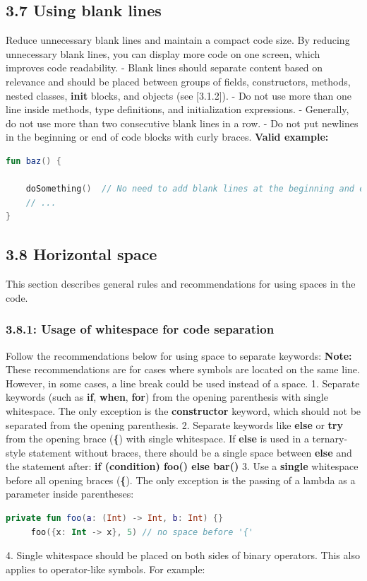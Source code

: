 \subsection*{\textbf{3.7 Using blank lines}}
\label{sec:3.7}
Reduce unnecessary blank lines and maintain a compact code size. By reducing unnecessary blank lines, you can display more code on one screen, which improves code readability.
- Blank lines should separate content based on relevance and should be placed between groups of fields, constructors, methods, nested classes, \textbf{init} blocks, and objects (see [3.1.2]).
- Do not use more than one line inside methods, type definitions, and initialization expressions.
- Generally, do not use more than two consecutive blank lines in a row.
- Do not put newlines in the beginning or end of code blocks with curly braces.
\textbf{Valid example:}
\begin{lstlisting}[language=Kotlin]
fun baz() {
        
    doSomething()  // No need to add blank lines at the beginning and end of the code block
    // ...
}
\end{lstlisting}
\subsection*{\textbf{3.8 Horizontal space}}
\label{sec:3.8}
This section describes general rules and recommendations for using spaces in the code.
\subsubsection*{\textbf{3.8.1: Usage of whitespace for code separation}}
\leavevmode\newline
\label{sec:3.8.1}
Follow the recommendations below for using space to separate keywords:
\textbf{Note:} These recommendations are for cases where symbols are located on the same line. However, in some cases, a line break could be used instead of a space.
1.  Separate keywords (such as \textbf{if}, \textbf{when}, \textbf{for}) from the opening parenthesis with single whitespace.
    The only exception is the \textbf{constructor} keyword, which should not be separated from the opening parenthesis.
2.  Separate keywords like \textbf{else} or \textbf{try} from the opening brace (\textbf{\{}) with single whitespace.
    If \textbf{else} is used in a ternary-style statement without braces, there should be a single space between \textbf{else} and the statement after: \textbf{if (condition) foo() else bar()}
3.  Use a \textbf{single} whitespace before all opening braces (\textbf{\{}). The only exception is the passing of a lambda as a parameter inside parentheses:
\begin{lstlisting}[language=Kotlin]
     private fun foo(a: (Int) -> Int, b: Int) {}
     foo({x: Int -> x}, 5) // no space before '{'
\end{lstlisting}
4.  Single whitespace should be placed on both sides of binary operators. This also applies to operator-like symbols.
    For example: 
    
